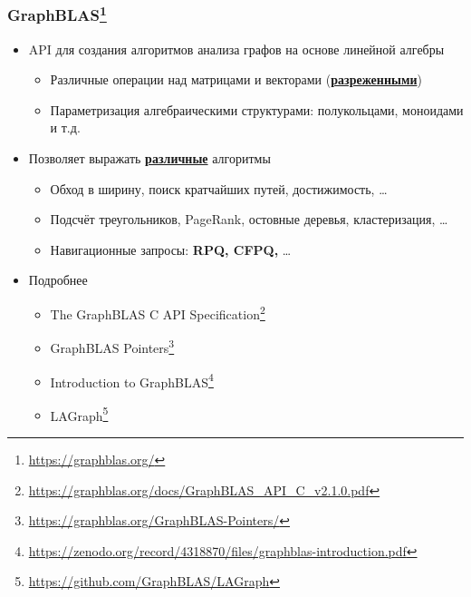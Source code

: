 \documentclass[xcolor=table,aspectratio=169]{beamer}
\begin{document}
\begin{frame}[fragile]
  \frametitle{GraphBLAS\footnote{\url{https://graphblas.org/}}}
  \begin{itemize}
    \item API для создания алгоритмов анализа графов на основе линейной алгебры 
    \begin{itemize}
      \item Различные операции над матрицами и векторами (\underline{\textbf{разреженными}})
      \item Параметризация алгебраическими структурами: полукольцами, моноидами и т.д.
    \end{itemize}
    \item Позволяет выражать \underline{\textbf{различные}} алгоритмы
    \begin{itemize}
      \item Обход в ширину, поиск кратчайших путей, достижимость, \ldots
      \item Подсчёт треугольников, PageRank, остовные деревья, кластеризация, \ldots
      \item[\color{red}{\tiny{$\blacktriangleright$}}] Навигационные запросы: \textbf{RPQ, CFPQ,} \ldots
    \end{itemize}
    \item Подробнее
    \begin{itemize}
      \item The GraphBLAS C API Specification\footnote{\url{https://graphblas.org/docs/GraphBLAS_API_C_v2.1.0.pdf}}
      \item GraphBLAS Pointers\footnote{\url{https://graphblas.org/GraphBLAS-Pointers/}}
      \item Introduction to GraphBLAS\footnote{\url{https://zenodo.org/record/4318870/files/graphblas-introduction.pdf}}
      \item LAGraph\footnote{\url{https://github.com/GraphBLAS/LAGraph}}
    \end{itemize}
    \end{itemize}
\end{frame}
\end{document}
